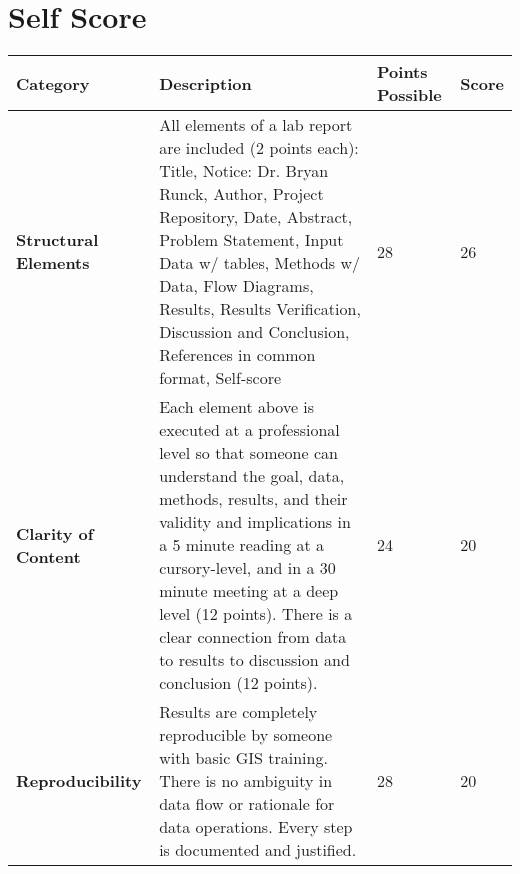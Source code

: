 \documentclass[article,12pt]{article}
\numberwithin{equation}{section}
\begin{document}
\section*{Self Score}
\begin{tabular}{|p{.2\linewidth}|p{.2\linewidth}|p{.2\linewidth}|p{.1\linewidth}|}
	\hline
	\textbf{Category}            & \textbf{Description}                                                                                                                                                                                                                                                                                                                                              & \textbf{Points Possible} & \textbf{Score} \\ \hline
\vspace{.2in}\textbf{Structural Elements} & {\tiny All elements of a lab report are included (2 points each): Title, Notice: Dr. Bryan Runck, Author, Project Repository, Date, Abstract, Problem Statement, Input Data w/ tables, Methods w/ Data, Flow Diagrams, Results, Results Verification, Discussion and Conclusion, References in common format, Self-score}                                        & \vspace{.2in}28              &   \vspace{.2in}26    \\ \hline
	\vspace{.2in}\textbf{Clarity of Content}  & {\tiny Each element above is executed at a professional level so that someone can understand the goal, data, methods, results, and their validity and implications in a 5 minute reading at a cursory-level, and in a 30 minute meeting at a deep level (12 points). There is a clear connection from data to results to discussion and conclusion (12 points).} & \vspace{.2in}24              &  \vspace{.2in}20     \\ \hline
	\vspace{.2in}\textbf{Reproducibility}     & {\tiny Results are completely reproducible by someone with basic GIS training. There is no ambiguity in data flow or rationale for data operations. Every step is documented and justified.}                                                                                                                                                                     & \vspace{.2in}28              &     \vspace{.2in}20  \\ \hline

\end{tabular}
\end{document}
